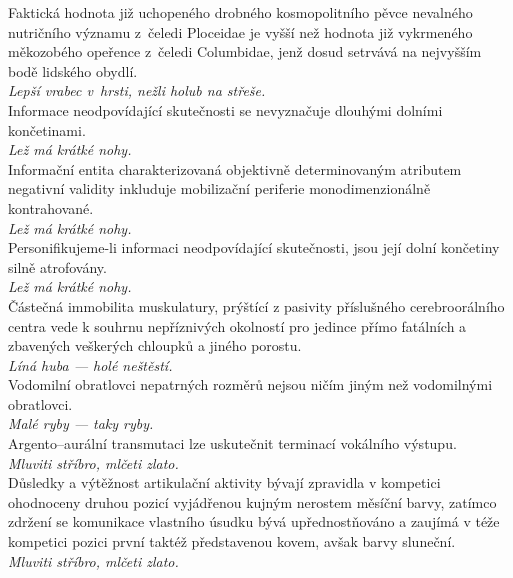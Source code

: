 \begin{multicols}{2}
\noindent
Faktická hodnota již uchopeného drobného kosmopolitního pěvce
nevalného nutričního významu z~čeledi Ploceidae je vyšší
než hodnota již vykrmeného měkozobého opeřence z~čeledi
Columbidae, jenž dosud setrvává na nejvyšším bodě lidského obydlí.\\[1 mm]
{\sl Lepší vrabec v~hrsti, nežli holub na střeše.}\\

\noindent
Informace neodpovídající skutečnosti se nevyznačuje dlouhými
dolními končetinami.\\[1 mm]
{\sl Lež má krátké nohy.}\\

\noindent
Informační entita charakterizovaná objektivně determinovaným
atributem negativní validity inkluduje mobilizační periferie
monodimenzionálně kontrahované.\\[1 mm]
{\sl Lež má krátké nohy.}\\

\noindent
Personifikujeme-li informaci neodpovídající skutečnosti, jsou její
dolní končetiny silně atrofovány.\\[1 mm]
{\sl Lež má krátké nohy.}\\

\noindent
Částečná immobilita muskulatury, prýštící z pasivity příslušného
cerebroorálního centra vede k souhrnu nepříznivých okolností
pro jedince přímo fatálních a zbavených veškerých chloupků a
jiného porostu.\\[1 mm]
{\sl Líná huba --- holé neštěstí.}\\

\noindent
Vodomilní obratlovci nepatrných rozměrů nejsou ničím jiným
než vodomilnými obratlovci.\\[1 mm]
{\sl Malé ryby --- taky ryby.}\\

\noindent
Argento--aurální transmutaci lze uskutečnit terminací vokálního
výstupu.\\[1 mm]
{\sl Mluviti stříbro, mlčeti zlato.}\\

\noindent
Důsledky a výtěžnost artikulační aktivity bývají zpravidla
v kompetici ohodnoceny druhou pozicí vyjádřenou kujným nerostem měsíční
barvy, zatímco zdržení se komunikace vlastního úsudku bývá upřednostňováno
a zaujímá v téže kompetici pozici první taktéž představenou kovem,
avšak barvy sluneční.\\[1 mm]
{\sl Mluviti stříbro, mlčeti zlato.}\\


\end{multicols}
